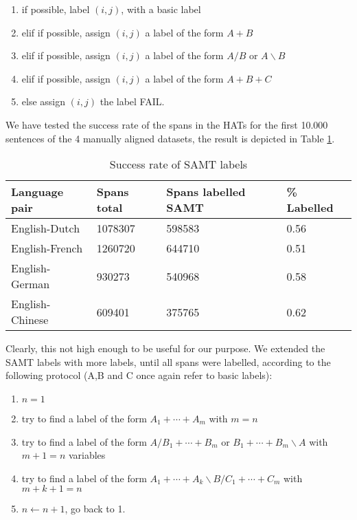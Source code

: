 \documentclass{article}
\begin{document}
\begin{enumerate}
\item if possible, label $(i,j)$, with a basic label
\item elif if possible, assign $(i,j)$ a label of the form $A+B$
\item elif if possible, assign $(i,j)$ a label of the form $A/B$ or $A\backslash B$
\item elif if possible, assign $(i,j)$ a label of the form $A+B+C$
\item else assign $(i,j)$ the label FAIL.
\end{enumerate}

We have tested the success rate of the spans in the HATs for the first 10.000 sentences of the 4 manually aligned datasets, the result is depicted in Table \ref{tab:SAMT}.

\begin{table}[!ht]
\begin{tabular}{|l|l|l|l|}
\hline
\textbf{Language pair} & \textbf{Spans total} & \textbf{Spans labelled SAMT} & \textbf{\% Labelled}\\
\hline \hline
English-Dutch & 1078307 & 598583 & 0.56\\
\hline
English-French & 1260720 & 644710 & 0.51\\
\hline
English-German & 930273 & 540968 & 0.58\\
\hline
English-Chinese & 609401 & 375765 & 0.62\\
\hline
\end{tabular}
\caption{Success rate of SAMT labels}\label{tab:SAMT}
\end{table}

Clearly, this not high enough to be useful for our purpose. We extended the SAMT labels with more labels, until all spans were labelled, according to the following protocol (A,B and C once again refer to basic labels):

\begin{enumerate}
\item $n = 1$
\item try to find a label of the form $A_1+\cdots+A_m$ with $m =n$
\item try to find a label of the form $A/B_1+\cdots+B_m$ or $B_1+\cdots+B_m\backslash A$ with $m+1=n$ variables
\item try to find a label of the form $A_1+\cdots+A_k\backslash B/C_1+\cdots+C_m$ with $m+k+1=n$ 
\item $n\leftarrow n+1$, go back to 1.
\end{enumerate}
\end{document}
